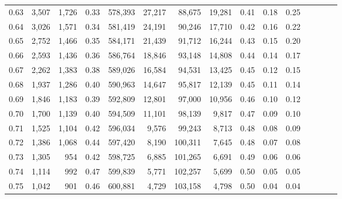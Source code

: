 \begin{tabular}{rrrcrrrrrrrrrrr}
0.63 &   3,507 &  1,726 &                                       0.33 &  578,393 &   27,217 &   88,675 &   19,281 &  0.41 &  0.18 &                         0.25 \\
0.64 &   3,026 &  1,571 &                                       0.34 &  581,419 &   24,191 &   90,246 &   17,710 &  0.42 &  0.16 &                         0.22 \\
0.65 &   2,752 &  1,466 &                                       0.35 &  584,171 &   21,439 &   91,712 &   16,244 &  0.43 &  0.15 &                         0.20 \\
0.66 &   2,593 &  1,436 &                                       0.36 &  586,764 &   18,846 &   93,148 &   14,808 &  0.44 &  0.14 &                         0.17 \\
0.67 &   2,262 &  1,383 &                                       0.38 &  589,026 &   16,584 &   94,531 &   13,425 &  0.45 &  0.12 &                         0.15 \\
0.68 &   1,937 &  1,286 &                                       0.40 &  590,963 &   14,647 &   95,817 &   12,139 &  0.45 &  0.11 &                         0.14 \\
0.69 &   1,846 &  1,183 &                                       0.39 &  592,809 &   12,801 &   97,000 &   10,956 &  0.46 &  0.10 &                         0.12 \\
0.70 &   1,700 &  1,139 &                                       0.40 &  594,509 &   11,101 &   98,139 &    9,817 &  0.47 &  0.09 &                         0.10 \\
0.71 &   1,525 &  1,104 &                                       0.42 &  596,034 &    9,576 &   99,243 &    8,713 &  0.48 &  0.08 &                         0.09 \\
0.72 &   1,386 &  1,068 &                                       0.44 &  597,420 &    8,190 &  100,311 &    7,645 &  0.48 &  0.07 &                         0.08 \\
0.73 &   1,305 &    954 &                                       0.42 &  598,725 &    6,885 &  101,265 &    6,691 &  0.49 &  0.06 &                         0.06 \\
0.74 &   1,114 &    992 &                                       0.47 &  599,839 &    5,771 &  102,257 &    5,699 &  0.50 &  0.05 &                         0.05 \\
0.75 &   1,042 &    901 &                                       0.46 &  600,881 &    4,729 &  103,158 &    4,798 &  0.50 &  0.04 &                         0.04 \\

\end{tabular}
